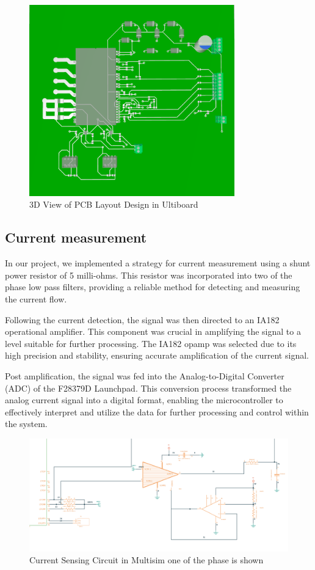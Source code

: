 \begin{figure}[H]
	\centering
	\includegraphics[width=3.5in]{sections/section4/images/PCBDesign/Ultiboard/3DTopView.png}
	\caption{3D View of PCB Layout Design in Ultiboard}
\end{figure}


\subsection{Current measurement}

In our project, we implemented a strategy for current measurement using a shunt power resistor of 5 milli-ohms. This resistor was incorporated into two of the phase low pass filters, providing a reliable method for detecting and measuring the current flow.

Following the current detection, the signal was then directed to an IA182 operational amplifier. This component was crucial in amplifying the signal to a level suitable for further processing. The IA182 opamp was selected due to its high precision and stability, ensuring accurate amplification of the current signal.

Post amplification, the signal was fed into the Analog-to-Digital Converter (ADC) of the F28379D Launchpad. This conversion process transformed the analog current signal into a digital format, enabling the microcontroller to effectively interpret and utilize the data for further processing and control within the system. 



\begin{figure}[H]
	\centering
	\includegraphics[width=6in]{sections/section4/images/PCBDesign/Multisim/MultisimCurrentSensing.png}
	\caption{Current Sensing Circuit in Multisim one of the phase is shown}
\end{figure}
\newpage